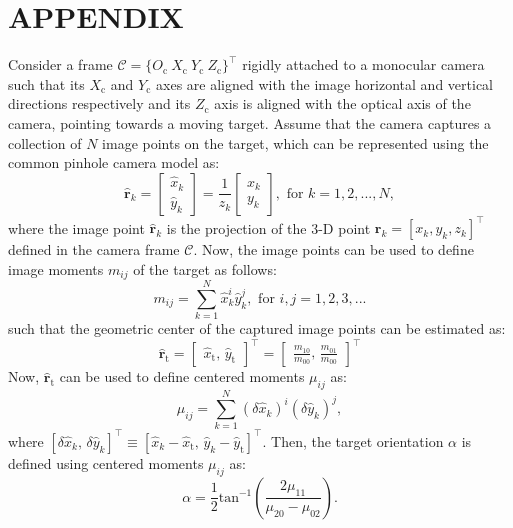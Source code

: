 \documentclass[lettersize,journal]{IEEEtran}
\begin{document}
\section*{APPENDIX}
Consider a frame $\mathcal{C}=\{O_{\text{c}} ~X_{\text{c}} ~Y_{\text{c}} ~Z_{\text{c}}\}^{\top}$ rigidly attached to a monocular camera such that its $X_{\text{c}}$ and $Y_{\text{c}}$ axes are aligned with the image horizontal and vertical directions respectively and its $Z_{\text{c}}$ axis is aligned with the optical axis of the camera, pointing towards a moving target.
Assume that the camera captures a collection of $N$ image points on the target, which can be represented using the common pinhole camera model as:
\begin{equation} \label{Eq. (A1)}
    \boldsymbol{\hat{r}}_k = \begin{bmatrix} \hat{x}_k \\ \hat{y}_k \end{bmatrix}
    = \frac{1}{z_{k}} \begin{bmatrix} x_{k} \\ y_{k}\end{bmatrix}, \text{ for } k=1,2,...,N,
\end{equation}
where the image point $\boldsymbol{\hat{r}}_k$ is the projection of the 3-D point $\boldsymbol{r}_k = [x_k, y_k, z_k]^{\top}$ defined in the camera frame $\mathcal{C}$.
Now, the image points can be used to define image moments $m_{ij}$ of the target as follows:
\begin{equation} \label{Eq. (A2)}
    m_{ij} = \sum^{N}_{k=1} \hat{x}_k^i \hat{y}_k^j,  \text{ for } i,j=1,2,3,...
\end{equation}
such that the geometric center of the captured image points can be estimated as:
\begin{equation} \label{Eq. (A3)}
    \boldsymbol{\hat{r}}_{\text{t}} = \begin{bmatrix} \hat{x}_{\text{t}},\,\hat{y}_{\text{t}} \end{bmatrix}^{\top}
    = \begin{bmatrix} \frac{m_{10}}{m_{00}},\,\frac{m_{01}}{m_{00}} \end{bmatrix}^{\top}
\end{equation}
Now, $\boldsymbol{\hat{r}}_{\text{t}}$ can be used to define centered moments $\mu_{ij}$ as:
\begin{equation} \label{Eq. (A4)}
    \mu_{ij} = \sum^{N}_{k=1} (\delta \hat{x}_k)^i (\delta \hat{y}_k)^j,
\end{equation}
where $[\delta \hat{x}_k,\,\delta \hat{y}_k]^{\top} \equiv [\hat{x}_k - \hat{x}_{\text{t}},\,\hat{y}_k - \hat{y}_{\text{t}}]^{\top}$. 
Then, the target orientation $\alpha$ is defined using centered moments $\mu_{ij}$ as:
\begin{equation} \label{Eq. (A5)}
    \alpha = \frac{1}{2} \text{tan}^{-1}\left( \frac{2 \mu_{11}}{\mu_{20} - \mu_{02}}\right).
\end{equation}
\end{document}
